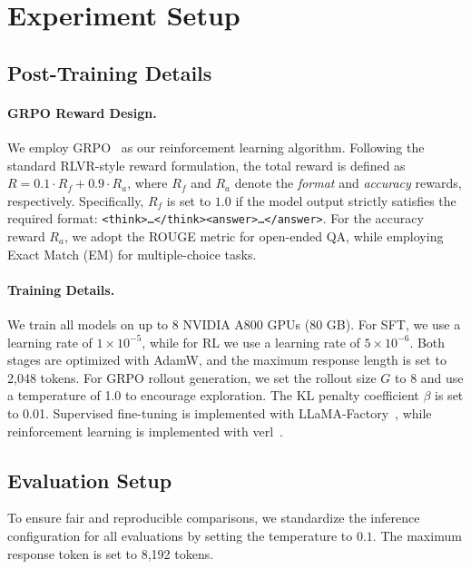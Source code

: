 \documentclass{llmxive}
\begin{document}
\section{Experiment Setup}
\subsection{Post-Training Details}\label{app:exp-details}
\paragraph{GRPO Reward Design.}
We employ GRPO~\cite{shao2024deepseekmath} as our reinforcement learning algorithm. Following the standard RLVR-style reward formulation, the total reward is defined as $R = 0.1 \cdot R_f + 0.9 \cdot R_a$, where $R_f$ and $R_a$ denote the \textit{format} and \textit{accuracy} rewards, respectively. Specifically, $R_f$ is set to $1.0$ if the model output strictly satisfies the required format: \texttt{<think>\ldots</think><answer>\ldots</answer>}. For the accuracy reward $R_a$, we adopt the ROUGE metric for open-ended QA, while employing Exact Match (EM) for multiple-choice tasks.

\paragraph{Training Details.} \label{app:train-details}
We train all models on up to 8 NVIDIA A800 GPUs (80 GB). 
For SFT, we use a learning rate of $1\times10^{-5}$, while for RL we use a learning rate of $5\times10^{-6}$. 
Both stages are optimized with AdamW, and the maximum response length is set to 2,048 tokens. 
For GRPO rollout generation, we set the rollout size $G$ to 8 and use a temperature of 1.0 to encourage exploration. 
The KL penalty coefficient $\beta$ is set to 0.01. 
Supervised fine-tuning is implemented with LLaMA-Factory~\cite{zheng2024llamafactoryunifiedefficientfinetuning}, while reinforcement learning is implemented with verl~\cite{verl}.

\subsection{Evaluation Setup}
\label{app:model-config}
To ensure fair and reproducible comparisons, we standardize the inference configuration for all evaluations by setting the temperature to $0.1$. The maximum response token is set to 8,192 tokens.
\end{document}
